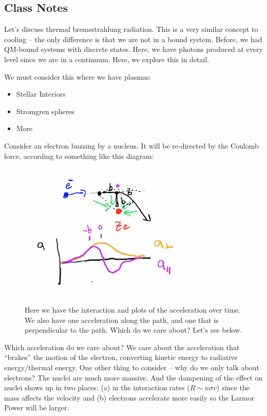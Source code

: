 \documentclass{article}
\begin{document}
\subsection{Class Notes}

Let's discuss thermal bremsstrahlung radiation. This is a very similar concept to cooling -- the only difference is that we are not in a bound system. Before, we had QM-bound systems with discrete states. Here, we have photons produced at every level since we are in a continuum. Here, we explore this in detail. 

We must consider this where we have plasmas:
\begin{itemize}
\item Stellar Interiors
\item Stromgren spheres
\item More
\end{itemize}

Consider an electron buzzing by a nucleus. It will be re-directed by the Coulomb force, according to something like this diagram:

\begin{figure}
    \centering
    \includegraphics[width=0.75\textwidth]{Screen Shot 2020-10-13 at 11.28.08 AM.png}
    \caption{Here we have the interaction and plots of the acceleration over time. We also have one acceleration along the path, and one that is perpendicular to the path. Which do we care about? Let's see below. }
    \label{fig:thermbrem}
\end{figure}

Which acceleration do we care about? We care about the acceleration that ``brakes'' the motion of the electron, converting kinetic energy to radiative energy/thermal energy. One other thing to consider -- why do we only talk about electrons? The nuclei are much more massive. And the dampening of the effect on nuclei shows up in two places: (a) in the interaction rates ($R \sim n \sigma v$) since the mass affects the velocity and (b) electrons accelerate more easily so the Larmor Power will be larger. 
\end{document}
